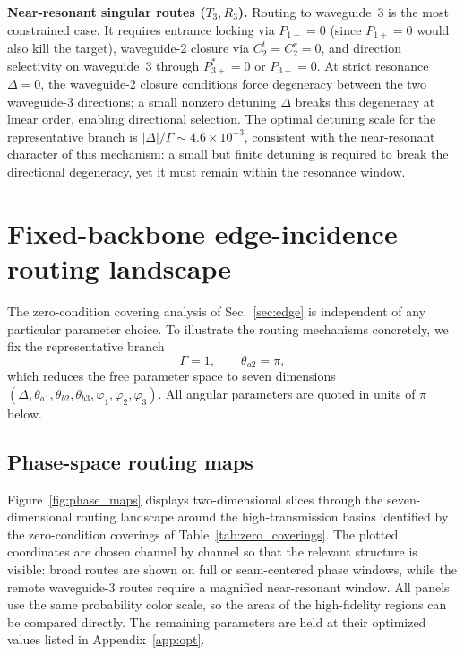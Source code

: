 \documentclass[aps,pra,reprint,superscriptaddress,nofootinbib,longbibliography,floatfix]{revtex4-2}
\newcommand{\Del}{\Delta}
\newcommand{\Gam}{\Gamma}
\newcommand{\ph}{\varphi}
\newcommand{\thaone}{\theta_{a1}}
\newcommand{\thatwo}{\theta_{a2}}
\newcommand{\thbtwo}{\theta_{b2}}
\newcommand{\thbthree}{\theta_{b3}}
\newcommand{\Poneplus}{P_{1+}}
\newcommand{\Poneminus}{P_{1-}}
\begin{document}
\textbf{Near-resonant singular routes ($T_3,R_3$).}
Routing to waveguide~3 is the most constrained case.
It requires entrance locking via $\Poneminus=0$ (since $\Poneplus=0$ would also kill the target), waveguide-2 closure via $C_2^t=C_2^r=0$, and direction selectivity on waveguide~3 through $P_{3+}^*=0$ or $P_{3-}=0$.
At strict resonance $\Del=0$, the waveguide-2 closure conditions force degeneracy between the two waveguide-3 directions; a small nonzero detuning $\Del$ breaks this degeneracy at linear order, enabling directional selection.
The optimal detuning scale for the representative branch is $|\Del|/\Gam\sim 4.6\times10^{-3}$, consistent with the near-resonant character of this mechanism: a small but finite detuning is required to break the directional degeneracy, yet it must remain within the resonance window.

\section{Fixed-backbone edge-incidence routing landscape}
\label{sec:routing}

The zero-condition covering analysis of Sec.~\ref{sec:edge} is independent of any particular parameter choice.
To illustrate the routing mechanisms concretely, we fix the representative branch
\begin{equation}
  \boxed{\Gam=1,\qquad \thatwo=\pi,}
\end{equation}
which reduces the free parameter space to seven dimensions $(\Delta,\thaone,\thbtwo,\thbthree,\ph_1,\ph_2,\ph_3)$.
All angular parameters are quoted in units of $\pi$ below.

\subsection{Phase-space routing maps}

Figure~\ref{fig:phase_maps} displays two-dimensional slices through the seven-dimensional routing landscape around the high-transmission basins identified by the zero-condition coverings of Table~\ref{tab:zero_coverings}.
The plotted coordinates are chosen channel by channel so that the relevant structure is visible: broad routes are shown on full or seam-centered phase windows, while the remote waveguide-3 routes require a magnified near-resonant window.
All panels use the same probability color scale, so the areas of the high-fidelity regions can be compared directly.
The remaining parameters are held at their optimized values listed in Appendix~\ref{app:opt}.
\end{document}
